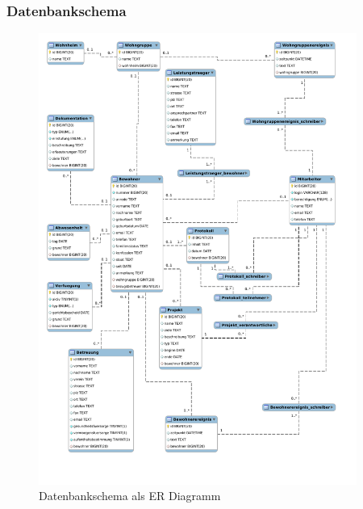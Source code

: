 \newpage

\subsubsection{Datenbankschema}
\begin{figure}[htp!]
	\begin{center}
		\includegraphics[width=0.93\textwidth]{scheme}
	\end{center}
	\caption{Datenbankschema als ER Diagramm}
	\label{ERDiagram}
\end{figure}

